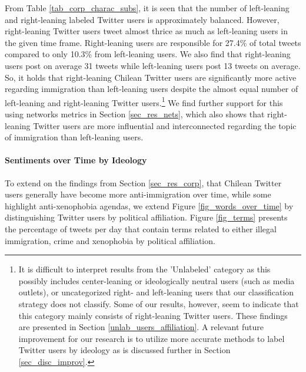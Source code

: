     From Table \ref{tab_corp_charac_subs}, it is seen that the number of left-leaning and right-leaning labeled Twitter users is approximately balanced. However, right-leaning Twitter users tweet almost thrice as much as left-leaning users in the given time frame. Right-leaning users are responsible for 27.4\% of total tweets compared to only 10.3\% from left-leaning users. We also find that right-leaning users post on average 31 tweets while left-leaning users post 13 tweets on average. So, it holds that right-leaning Chilean Twitter users are significantly more active regarding immigration than left-leaning users despite the almost equal number of left-leaning and right-leaning Twitter users.\footnote{It is difficult to interpret results from the 'Unlabeled' category as this possibly includes center-leaning or ideologically neutral users (such as media outlets), or uncategorized right- and left-leaning users that our classification strategy does not classify. Some of our results, however, seem to indicate that this category mainly consists of right-leaning Twitter users. These findings are presented in Section \ref{unlab_users_affiliation}. A relevant future improvement for our research is to utilize more accurate methods to label Twitter users by ideology as is discussed further in Section \ref{sec_disc_improv}.} 
    We find further support for this using networks metrics in Section \ref{sec_res_nets}, which also shows that right-leaning Twitter users are more influential and interconnected regarding the topic of immigration than left-leaning users.
    
    
    \paragraph{Sentiments over Time by Ideology}
    
    To extend on the findings from Section \ref{sec_res_corp}, that Chilean Twitter users generally have become more anti-immigration over time, while some highlight anti-xenophobia agendas, we extend Figure \ref{fig_words_over_time} by distinguishing Twitter users by political affiliation. Figure \ref{fig_terms} presents the percentage of tweets per day that contain terms related to either illegal immigration, crime and xenophobia by political affiliation.
    

